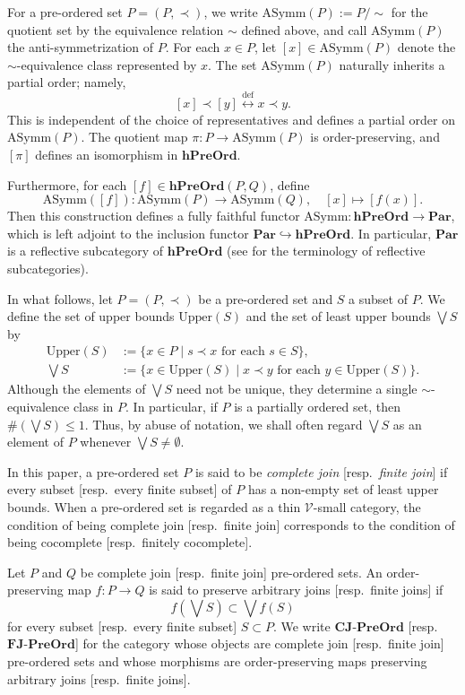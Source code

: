 \documentclass[12pt, a4paper]{amsart}
\theoremstyle{definition}
\newcommand{\defarrow}{\mathrel{\stackrel{\mathrm{def}}{\longleftrightarrow}}}
\newcommand{\AS}{\mathrm{ASymm}}
\newcommand{\ParOrd}{\mathbf{Par}}
\newcommand{\hPreOrd}{\mathbf{hPreOrd}}
\newcommand{\CompJoinPreOrd}{\mathbf{CJ}\text{-}\mathbf{PreOrd}}
\newcommand{\FinJoinPreOrd}{\mathbf{FJ}\text{-}\mathbf{PreOrd}}
\newcommand{\Upper}{\mathrm{Upper}}
\begin{document}
For a pre-ordered set $P=(P,\prec)$, we write
$\AS(P):=P/\sim$
for the quotient set by the equivalence relation $\sim$ defined above, and call $\AS(P)$ the anti-symmetrization of $P$.
For each $x\in P$, let $[x]\in\AS(P)$ denote the $\sim$-equivalence class
represented by $x$.
The set $\AS(P)$ naturally inherits a partial order; namely,
\[
[x]\prec [y]
\defarrow
x\prec y.
\]
This is independent of the choice of representatives and defines a partial
order on $\AS(P)$.
The quotient map $\pi:P\to\AS(P)$ is order-preserving, and $[\pi]$ defines
an isomorphism in $\hPreOrd$.

Furthermore, for each $[f]\in\hPreOrd(P,Q)$, define
\[
\AS([f]):\AS(P)\to\AS(Q),\quad [x]\mapsto [f(x)].
\]
Then this construction defines a fully faithful functor
$\AS:\hPreOrd\to\ParOrd$, which is left adjoint to the inclusion functor
$\ParOrd\hookrightarrow\hPreOrd$.
In particular, $\ParOrd$ is a reflective subcategory of $\hPreOrd$
(see \cite[Definition 4.6.12]{Riehl2016category} for the terminology of
reflective subcategories).


In what follows, let $P=(P,\prec)$ be a pre-ordered set and $S$ a subset of
$P$. We define the set of upper bounds $\Upper(S)$ and the set of least
upper bounds $\bigvee S$ by
\begin{align*}
    \Upper(S)
    &:=
    \{x\in P\mid s\prec x\text{ for each }s\in S\},\\
    \bigvee S
    &:=
    \{x\in\Upper(S)\mid x\prec y\text{ for each }y\in\Upper(S)\}.
\end{align*}
Although the elements of $\bigvee S$ need not be unique, they determine a
single $\sim$-equivalence class in $P$.
In particular, if $P$ is a partially ordered set, then
$\#(\bigvee S)\le 1$.
Thus, by abuse of notation, we shall often regard $\bigvee S$ as an element
of $P$ whenever $\bigvee S\neq\emptyset$.

In this paper, a pre-ordered set $P$ is said to be \emph{complete join}
[resp.~\emph{finite join}] if every subset [resp.~every finite subset] of
$P$ has a non-empty set of least upper bounds.
When a pre-ordered set is regarded as a thin $\mathcal{V}$-small category,
the condition of being complete join [resp.~finite join] corresponds to the
condition of being cocomplete [resp.~finitely cocomplete].

Let $P$ and $Q$ be complete join [resp.~finite join] pre-ordered sets.
An order-preserving map $f:P\to Q$ is said to preserve arbitrary joins
[resp.~finite joins] if
\[
f(\bigvee S) \subset \bigvee f(S)
\]
for every subset [resp.~every finite subset] $S\subset P$.
We write $\CompJoinPreOrd$ [resp.~$\FinJoinPreOrd$] for the category whose
objects are complete join [resp.~finite join] pre-ordered sets and whose
morphisms are order-preserving maps preserving arbitrary joins
[resp.~finite joins].
\end{document}
